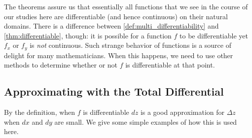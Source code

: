 The theorems assure us that essentially all functions that we see in the course of our studies here are differentiable (and hence continuous) on their natural domains. There is a difference between \autoref{def:multi_differentiability} and \autoref{thm:differentiable}, though: it is possible for a function $f$ to be differentiable yet $f_x$ or $f_y$ is \textit{not} continuous. Such strange behavior of functions is a source of delight for many mathematicians.  When this happens, we need to use other methods to determine whether or not $f$ is differentiable at that point.

%
%

\subsection{Approximating with the Total Differential}

By the definition, when $f$ is differentiable $dz$ is a good approximation for $\Delta z$ when $dx$ and $dy$ are small. We give some simple examples of how this is used here.

